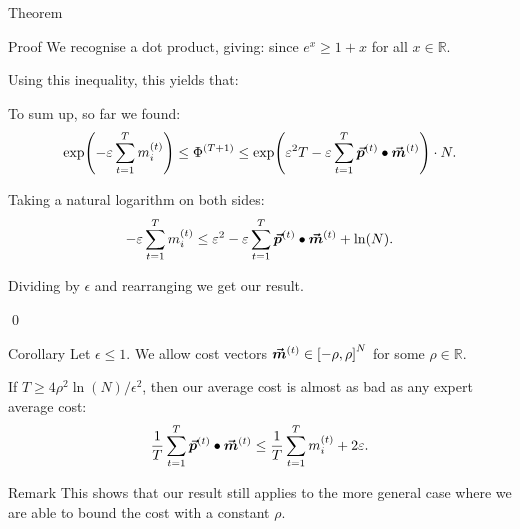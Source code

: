 \documentclass[a4paper]{article}
\begin{document}
\begin{parag}{Theorem}
\begin{subparag}{Proof}
        We recognise a dot product, giving: 
        since $e^{x} \geq 1 + x$ for all $x \in \mathbb{R}$.
        
        Using this inequality, this yields that: 
        
        To sum up, so far we found: 
        \[\exp\left(-\epsilon \sum_{t=1}^{T} m_i^{\left(t\right)}\right) \leq \Phi^{\left(T+1\right)} \leq \exp\left(\epsilon^2 T - \epsilon \sum_{t=1}^{T} \bvec{p}^{\left(t\right)} \dotprod \bvec{m}^{\left(t\right)}\right)\cdot N.\]

        Taking a natural logarithm on both sides: 
        \[-\epsilon \sum_{t=1}^{T} m_i^{\left(t\right)} \leq \epsilon^2 - \epsilon \sum_{t=1}^{T} \bvec{p}^{\left(t\right)} \dotprod \bvec{m}^{\left(t\right)} + \ln\left(N\right).\]

        Dividing by $\epsilon$ and rearranging we get our result.

        \qed
    \end{subparag}
\end{parag}

\begin{parag}{Corollary}
    Let $\epsilon \leq 1$. We allow cost vectors $\bvec{m}^{\left(t\right)} \in \left[-\rho, \rho\right]^N$ for some $\rho \in\mathbb{R}$.

    If $T \geq 4 \rho^2 \ln\left(N\right)/\epsilon^2$, then our average cost is almost as bad as any expert average cost: 
    \[\frac{1}{T} \sum_{t=1}^{T} \bvec{p}^{\left(t\right)} \dotprod \bvec{m}^{\left(t\right)} \leq \frac{1}{T} \sum_{t=1}^{T} m_i^{\left(t\right)} + 2 \epsilon.\]

    \begin{subparag}{Remark}
        This shows that our result still applies to the more general case where we are able to bound the cost with a constant $\rho$.
    \end{subparag}
\end{parag}
\end{document}
